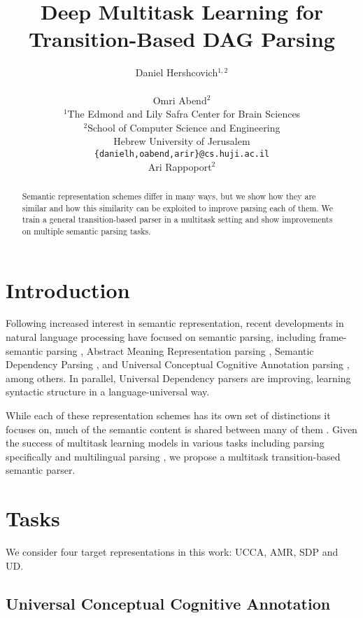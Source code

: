 \documentclass[11pt,a4paper]{article}
\title{Deep Multitask Learning for Transition-Based DAG Parsing}
\author{Daniel Hershcovich$^{1,2}$ \\
  \\\And
  Omri Abend$^2$ \\
  $^1$The Edmond and Lily Safra Center for Brain Sciences \\
  $^2$School of Computer Science and Engineering \\
  Hebrew University of Jerusalem \\
  \texttt{\{danielh,oabend,arir\}@cs.huji.ac.il}
  \\\And
  Ari Rappoport$^2$
}
\date{}
\begin{document}
\maketitle
\begin{abstract}
  Semantic representation schemes differ in many ways, but we show
  how they are similar and how this similarity can be exploited to
  improve parsing each of them.
  We train a general transition-based parser in a multitask setting
  and show improvements on multiple semantic parsing tasks.
\end{abstract}

\section{Introduction}\label{sec:introduction}

Following increased interest in semantic representation,
recent developments in natural language processing have focused on semantic parsing,
including frame-semantic parsing \cite{gildea2002automatic,swayamdipta2017frame,ringgaard2017sling},
Abstract Meaning Representation parsing \cite{damonte-17,11099},
Semantic Dependency Parsing \cite{P17-1186}, and
Universal Conceptual Cognitive Annotation parsing \cite{hershcovich2017a}, among others.
In parallel, Universal Dependency parsers \cite{dozat2016deep} are improving,
learning syntactic structure in a language-universal way.

While each of these representation schemes has its own set of distinctions it focuses on,
much of the semantic content is shared between many of them \cite{abend2017state}.
Given the success of multitask learning models in various tasks
\cite{collobert2008unified,luong2015multi,ruder2017overview}
including parsing specifically
\cite{Zhang2016StackpropagationIR,P17-1186,swayamdipta2017frame,guo2016exploiting}
and multilingual parsing \cite{TACL892},
we propose a multitask transition-based semantic parser.


\section{Tasks}\label{sec:tasks}

We consider four target representations in this work: UCCA, AMR, SDP and UD.

\subsection{Universal Conceptual Cognitive Annotation}\label{sec:ucca}
\end{document}
